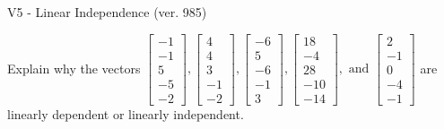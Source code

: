 \begin{exercise}
  \begin{exerciseTitle}V5 - Linear Independence (ver. 985)\end{exerciseTitle}
  \begin{exerciseStatement}
    Explain why the vectors \(\left[\begin{array}{r}
-1 \\
-1 \\
5 \\
-5 \\
-2
\end{array}\right] , \left[\begin{array}{r}
4 \\
4 \\
3 \\
-1 \\
-2
\end{array}\right] , \left[\begin{array}{r}
-6 \\
5 \\
-6 \\
-1 \\
3
\end{array}\right] , \left[\begin{array}{r}
18 \\
-4 \\
28 \\
-10 \\
-14
\end{array}\right] , \text{ and } \left[\begin{array}{r}
2 \\
-1 \\
0 \\
-4 \\
-1
\end{array}\right]\) are linearly dependent or linearly independent.	



\end{exerciseStatement}
\end{exercise}
